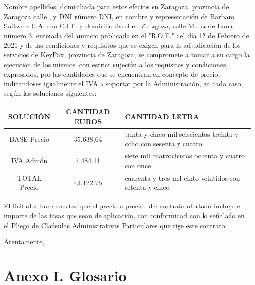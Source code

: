 \documentclass{article}
\begin{document}
Nombre apellidos, domiciliada para estos efectos en Zaragoza, provincia de Zaragoza calle , y DNI número DNI, en nombre y representación de Barbaro Software S.A. con C.I.F. y domicilio fiscal en Zaragoza, calle María de Luna número 3, enterada del anuncio publicado en el "B.O.E." del día 12 de Febrero de 2021 y de las condiciones y requisitos que se exigen para la adjudicación de los servicios de KeyPax, provincia de Zaragoza, se compromete a tomar a su cargo la ejecución de los mismos, con estrict sujeción a los requisitos y condiciones expresados, por las cantidades que se encuentran en concepto de precio, indicandoses igualmente el IVA a soportar por la Administración, en cada caso, según las soluciones siguientes:


\begin{table}[H]
    \centering
    \begin{tabular}{| c | c | p{30em} |}
    \hline
        SOLUCIÓN &  CANTIDAD EUROS & CANTIDAD LETRA \\ \hline
        BASE Precio &  35.638,64 & trinta y cinco mil seiscientos treinta y ocho con sesenta y cuatro\\ \hline
        IVA Admón &  7.484.11 & siete mil cuatrocientos ochenta y cuatro con once\\ \hline
        TOTAL Precio &  43.122.75 & cuarenta y tres mil cinto veintidos con setenta y cinco\\ \hline
    \end{tabular}
\end{table}

El licitador hace constar que el precio o precios del contrato ofertado incluye el importe de las tasas que sean de aplicación, con conformidad con lo señalado en el Pliego de Claúsulas Administrativas Particulares que rige este contrato.

Atentamente,

\pagebreak

\section*{Anexo I. Glosario}
\end{document}

